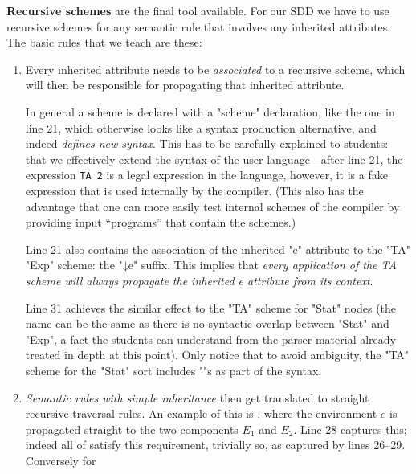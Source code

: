 \documentclass[11pt]{article} %
\begin{document}
\smallskip\noindent\textbf{Recursive schemes} are the final tool available. For our SDD we have to use recursive schemes
  for any semantic rule that involves any inherited attributes.  The basic rules that we teach are
  these:
  \begin{enumerate}

  \item Every inherited attribute needs to be \emph{associated} to a recursive scheme, which will
    then be responsible for propagating that inherited attribute.

    In general a scheme is declared with a "scheme" declaration, like the one in line 21, which
    otherwise looks like a syntax production alternative, and indeed \emph{defines new syntax}.
    This has to be carefully explained to students: that we effectively extend the syntax of the
    user language---after line 21, the expression \texttt{TA 2} is a legal expression in the
    language, however, it is a fake expression that is used internally by the compiler.  (This also
    has the advantage that one can more easily test internal schemes of the compiler by providing
    input ``programs'' that contain the schemes.)

    Line 21 also contains the association of the inherited "e" attribute to the "TA" "Exp" scheme:
    the "↓e" suffix.  This implies that \emph{every application of the TA scheme will always
      propagate the inherited e attribute from its context}.

    Line 31 achieves the similar effect to the "TA" scheme for "Stat" nodes (the name can be the
    same as there is no syntactic overlap between "Stat" and "Exp", a fact the students can
    understand from the parser material already treated in depth at this point).  Only notice that
    to avoid ambiguity, the "TA" scheme for the "Stat" sort includes "{}"s as part of the syntax.

  \item \emph{Semantic rules with simple inheritance} then get translated to straight recursive traversal
    rules.  An example of this is , where the environment $e$ is propagated straight to
    the two components $E_1$ and $E_2$. Line 28 captures this; indeed all of  satisfy
    this requirement,  trivially so, as captured by lines 26--29.  Conversely for 


\end{enumerate}
\end{document}

